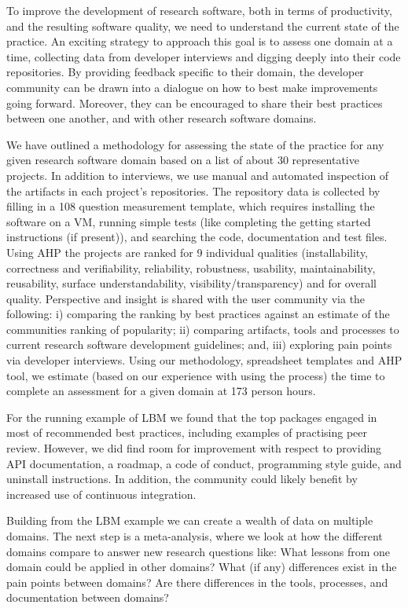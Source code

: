 \documentclass[runningheads]{llncs}
\begin{document}
To improve the development of research software, both in terms of productivity,
and the resulting software quality, we need to understand the current state of
the practice. An exciting strategy to approach this goal is to assess one domain
at a time, collecting data from developer interviews and digging deeply into
their code repositories. By providing feedback specific to their domain, the
developer community can be drawn into a dialogue on how to best make
improvements going forward. Moreover, they can be encouraged to share their best
practices between one another, and with other research software domains.

We have outlined a methodology for assessing the state of the practice for any
given research software domain based on a list of about 30 representative
projects.  In addition to interviews, we use manual and automated inspection of
the artifacts in each project's repositories.  The repository data is collected
by filling in a 108 question measurement template, which requires installing the
software on a VM, running simple tests (like completing the getting started
instructions (if present)), and searching the code, documentation and test
files. Using AHP the projects are ranked for 9 individual qualities
(installability, correctness and verifiability, reliability, robustness,
usability, maintainability, reusability, surface understandability,
visibility/transparency) and for overall quality.  Perspective and insight is
shared with the user community via the following: i) comparing the ranking by
best practices against an estimate of the communities ranking of popularity; ii)
comparing artifacts, tools and processes to current research software
development guidelines; and, iii) exploring pain points via developer
interviews. Using our methodology, spreadsheet templates and AHP tool, we
estimate (based on our experience with using the process) the time to complete
an assessment for a given domain at 173 person hours.

For the running example of LBM we found that the top packages engaged in most of
recommended best practices, including examples of practising peer review.
However, we did find room for improvement with respect to providing API
documentation, a roadmap, a code of conduct, programming style guide, and
uninstall instructions.  In addition, the community could likely benefit by
increased use of continuous integration.

Building from the LBM example we can create a wealth of data on multiple
domains.  The next step is a meta-analysis, where we look at how the different
domains compare to answer new research questions like: What lessons from one
domain could be applied in other domains? What (if any) differences exist in the
pain points between domains?  Are there differences in the tools, processes, and
documentation between domains?
\end{document}
